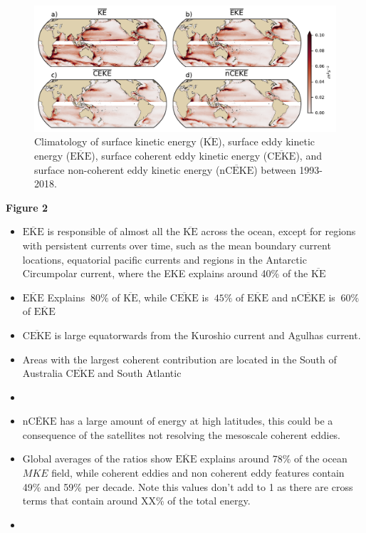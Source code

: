 \documentclass[draft,linenumbers]{agujournal2019}
\newcommand{\MKE}{\overline{\textrm{KE}}}
\newcommand{\MEKE}{\overline{\textrm{EKE}}}
\newcommand{\MCEKE}{\overline{\textrm{CEKE}}}
\newcommand{\MnCEKE}{\overline{\textrm{nCEKE}}}
\begin{document}
	\begin{figure}
	    \centering
	    \includegraphics[width=1\textwidth]{figures/mean_ke_maps_satellite.pdf}
	    \caption{Climatology of surface kinetic energy ($\MKE$), surface eddy kinetic energy ($\MEKE$), surface coherent eddy kinetic energy ($\MCEKE$), and surface non-coherent eddy kinetic energy ($\MnCEKE$) between 1993-2018.}
	    \label{fig:eddy_climatology}
	\end{figure}


	\textbf{Figure 2}
	\begin{itemize}
		\item $\MEKE$ is responsible of almost all the $\MKE$ across the ocean, except for regions with persistent currents over time, such as the mean boundary current locations, equatorial pacific currents and regions in the Antarctic Circumpolar current, where the EKE explains around 40\% of the $\MKE$
		\item $\MEKE$ Explains $~80\%$ of $\MKE$, while $\MCEKE$ is $~45\%$ of $\MEKE$ and $\MnCEKE$  is $~60\%$ of $\MEKE$ 
		\item $\MCEKE$ is large equatorwards from the Kuroshio current and Agulhas current.
		\item Areas with the largest coherent contribution are located in the South of Australia $\MCEKE$ and South Atlantic
		\item 
		\item $\MnCEKE$ has a large amount of energy at high latitudes, this could be a consequence of the satellites not resolving the mesoscale coherent eddies. 
		\item Global averages of the ratios show $\MEKE$ explains around 78\% of the ocean $MKE$ field, while coherent eddies and non coherent eddy features contain 49\% and 59\% per decade. Note this values don't add to 1 as there are cross terms that contain around XX\% of the total energy.
		\item  
	\end{itemize}
\end{document}
